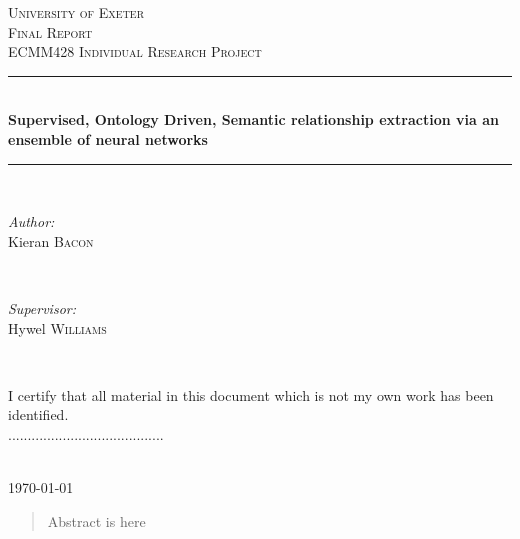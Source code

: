 \documentclass[11pt]{article} %
\newcommand{\HRule}{\rule{\linewidth}{0.5mm}} %
\begin{document}

\begin{titlepage}

\center %

\textsc{\LARGE University of Exeter}\\[1.0cm] %
\textsc{\Large Final Report}\\[0.5cm] %
\textsc{\large ECMM428 Individual Research Project}\\[0.5cm] %

\HRule \\[0.4cm]
{ \huge \bfseries Supervised, Ontology Driven, Semantic relationship extraction via an ensemble of neural networks}\\[0.4cm] %
\HRule \\[1.5cm]

\begin{minipage}{0.4\textwidth}
\begin{flushleft} \large
\emph{Author:}\\
Kieran \textsc{Bacon}%
\end{flushleft}
\end{minipage}
~
\begin{minipage}{0.4\textwidth}
\begin{flushright} \large
\emph{Supervisor:} \\
Hywel \textsc{Williams} %
\end{flushright}
\end{minipage}\\[3cm]

\begin{minipage}{0.8\textwidth}
\centering
I certify that all material in this document which is not my own work has been identified.\\

\vspace{1cm}
........................................

\end{minipage}\\[2cm]


{\large \today}\\[3cm] %

\begin{abstract}
\noindent Abstract is here 
\end{abstract}


\vfill %
\end{titlepage}
\end{document}
